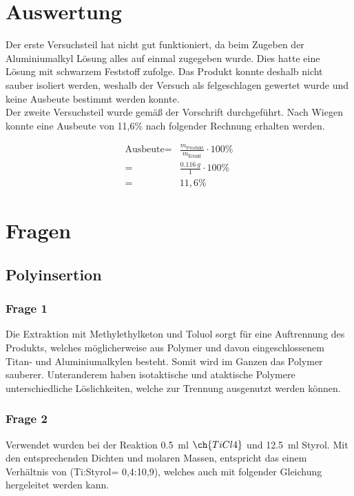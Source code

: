 \documentclass[10pt,a4paper,ngerman]{scrartcl}
\begin{document}
\section{Auswertung}

	Der erste Versuchsteil hat nicht gut funktioniert, da beim Zugeben der Aluminiumalkyl Lösung alles auf einmal zugegeben wurde.
	Dies hatte eine Lösung mit schwarzem Feststoff zufolge.
	Das Produkt konnte deshalb nicht sauber isoliert werden, weshalb der Versuch als felgeschlagen gewertet wurde und keine Ausbeute bestimmt werden konnte.\\
	Der zweite Versuchsteil wurde gemäß der Vorschrift durchgeführt. 
	Nach Wiegen konnte eine Ausbeute von 11,6\% nach folgender Rechnung erhalten werden.

			\begin{eqnarray}
				 \text{Ausbeute} =& \frac{m_\text{Produkt}}{m_\text{Edukt}} \cdot 100\%\\
				 =& \frac{\SI{0.116}{g}}{1} \cdot 100\% \\
				 =& 11,6\%
			\end{eqnarray}

\section{Fragen}

	\subsection{Polyinsertion}

		\subsubsection{Frage 1}

			Die Extraktion mit Methylethylketon und Toluol sorgt für eine Auftrennung des Produkts, welches möglicherweise aus Polymer und davon eingeschlossenem Titan- 
			und Aluminiumalkylen besteht. Somit wird im Ganzen das Polymer sauberer. 
			Unteranderem haben isotaktische und ataktische Polymere unterschiedliche Löslichkeiten, welche zur Trennung ausgenutzt werden können.  

		\subsubsection{Frage 2}

			Verwendet wurden bei der Reaktion \SI{0,5}{ml} $\ch{TiCl4}$ und \SI{12,5}{ml} Styrol. Mit den entsprechenden Dichten und molaren Massen, entspricht das einem 
			Verhältnis von (Ti:Styrol= 0,4:10,9), welches auch mit folgender Gleichung hergeleitet werden kann.
\end{document}
